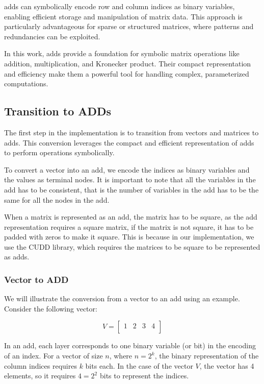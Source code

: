 \glspl{add} can symbolically encode row and column indices as binary variables, enabling efficient storage and manipulation of matrix data.
This approach is particularly advantageous for sparse or structured matrices, where patterns and redundancies can be exploited.

In this work, \glspl{add} provide a foundation for symbolic matrix operations like addition, multiplication, and Kronecker product. Their compact representation and efficiency make them a powerful tool for handling complex, parameterized computations.

\subsection{Transition to ADDs}\label{subsec:transition-to-adds}
The first step in the implementation is to transition from vectors and matrices to \glspl{add}.
This conversion leverages the compact and efficient representation of \glspl{add} to perform operations symbolically.

To convert a vector into an \gls{add}, we encode the indices as binary variables and the values as terminal nodes.
It is important to note that all the variables in the \gls{add} has to be consistent, that is the number of variables in the \gls{add} has to be the same for all the nodes in the \gls{add}.

When a matrix is represented as an \gls{add}, the matrix has to be square, as the \gls{add} representation requires a square matrix, if the matrix is not square, it has to be padded with zeros to make it square.
This is because in our implementation, we use the CUDD library, which requires the matrices to be square to be represented as \glspl{add}.

\subsubsection{Vector to ADD}
We will illustrate the conversion from a vector to an \gls{add} using an example.
Consider the following vector:

\[
    V=
    \begin{bmatrix}
        1 & 2 & 3 & 4 \\
    \end{bmatrix}
\]

In an \gls{add}, each layer corresponds to one binary variable (or bit) in the encoding of an index. 
For a vector of size $n$, where $n = 2^k$, the binary representation of the column indices requires $k$ bits each. 
In the case of the vector $V$, the vector has 4 elements, so it requires $4 = 2^2$ bits to represent the indices.

